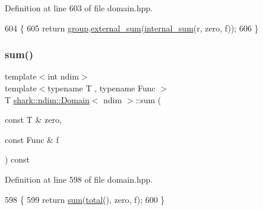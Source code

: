 Definition at line 603 of file domain.\+hpp.


\begin{DoxyCode}
604         \{
605             \textcolor{keywordflow}{return} \hyperlink{classshark_1_1ndim_1_1_domain_a2bbf100371762ce405efd218bc1e3d0f}{group}.\hyperlink{classshark_1_1_group_ac254938f11bae1e1cda77072468f9bc1}{external\_sum}(\hyperlink{classshark_1_1ndim_1_1_domain_ae6b753c7b16ffd14e6247d4b00c92d35}{internal\_sum}(r, zero, f));
606         \}
\end{DoxyCode}
\hypertarget{classshark_1_1ndim_1_1_domain_abe9e94aa18d934b151db4db18b42f7cc}{}\label{classshark_1_1ndim_1_1_domain_abe9e94aa18d934b151db4db18b42f7cc} 
\subsubsection{\texorpdfstring{sum()}{sum()}\hspace{0.1cm}{\footnotesize\ttfamily [3/3]}}
{\footnotesize\ttfamily template$<$int ndim$>$ \\
template$<$typename T , typename Func $>$ \\
T \hyperlink{classshark_1_1ndim_1_1_domain}{shark\+::ndim\+::\+Domain}$<$ ndim $>$\+::sum (\begin{DoxyParamCaption}\item[{const T \&}]{zero,  }\item[{const Func \&}]{f }\end{DoxyParamCaption}) const\hspace{0.3cm}{\ttfamily [inline]}}



Definition at line 598 of file domain.\+hpp.


\begin{DoxyCode}
598                                                                      \{
599             \textcolor{keywordflow}{return} \hyperlink{classshark_1_1ndim_1_1_domain_a4acf8890a0637ff9987c4dea1f72bf79}{sum}(\hyperlink{classshark_1_1ndim_1_1_domain_ae4357c99519b3efbaf2544828629de87}{total}(), zero, f);
600         \}
\end{DoxyCode}
\hypertarget{classshark_1_1ndim_1_1_domain_a8b68baf8f38340b6b550ebe4c3476c0b}{}\label{classshark_1_1ndim_1_1_domain_a8b68baf8f38340b6b550ebe4c3476c0b} 
